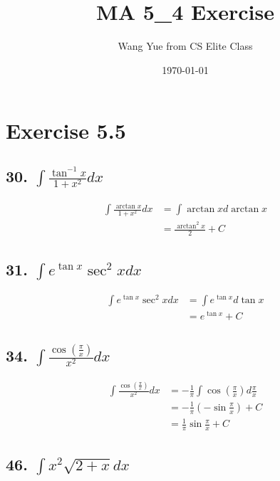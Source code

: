 \documentclass{article}
\begin{document}
    \title{MA 5\_4 Exercise}
    \author{Wang Yue from CS Elite Class}
    \date{\today}
    \maketitle
    
    \section*{Exercise 5.5}

    \subsection*{30. $\int \frac{\tan ^{-1} x }{1 + x^2} dx$}

    $$\begin{aligned}
        \int \frac{\arctan x}{1 + x^2}dx &= \int \arctan x d\arctan x \\
        &= \frac{\arctan^2 x}{2} + C
    \end{aligned}$$

    \subsection*{31. $\int e^{\tan x} \sec^2 x dx$}

    $$\begin{aligned}
        \int e^{\tan x} \sec^2 x dx &= \int e^{\tan x} d\tan x \\
        &= e^{\tan x} + C
    \end{aligned}$$

    \subsection*{34. $\int \frac{\cos(\frac \pi x)}{x^2} dx$}

    $$\begin{aligned}
        \int \frac{\cos(\frac \pi x)}{x^2} dx &= -\frac{1}{\pi} \int \cos (\frac \pi x) d\frac \pi x \\
        &= -\frac 1 \pi (-\sin \frac \pi x) + C \\
        &= \frac 1 \pi \sin \frac \pi x + C
    \end{aligned}$$

    \subsection*{46. $\int x^2\sqrt{2 + x} dx$}
\end{document}
